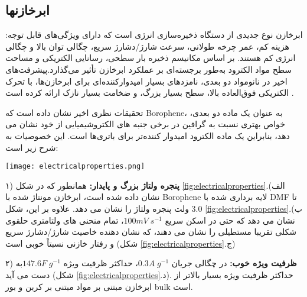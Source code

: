 \subsection{ابرخازنها}
ابرخازن نوع جدیدی از دستگاه ذخیره‌سازی انرژی است که دارای ویژگی‌های قابل توجه: هزینه کم، عمر چرخه طولانی، سرعت شارژ/دشارژ سریع، چگالی توان بالا و چگالی انرژی کم هستند. بر اساس مکانیسم ذخیره بار سطحی، رسانایی الکتریکی و مساحت سطح مواد الکترود به‌طور برجسته‌ای بر عملکرد ابرخازن تأثیر می‌گذارد.پیشرفت‌های اخیر در نانومواد دو بعدی، نامزدهای بسیار امیدوارکننده‌ای برای ابرخازن‌ها، \cite{wangPhaseTransformationGuided2014, lukatskayaCationIntercalationHigh2013, wuTwodimensionalVanadylPhosphate2013, zhangBoropheneExtremelyHigh2016} با تحرک الکتریکی فوق‌العاده بالا، سطح بسیار بزرگ، و ضخامت بسیار نازک ارائه کرده است \cite{zhangBoropheneExtremelyHigh2016, zhanBoronSupercapacitors2016}. 

تحقیقات نظری اخیر نشان داده است که \gls{Borophene}، به عنوان یک ماده دو بعدی، خواص بهتری نسبت به گرافین در برخی جنبه های الکتروشیمیایی از خود نشان می دهد، بنابراین یک ماده الکترود امیدوار کننده‌تر برای باتری‌ها است. این خصوصیات به شرح زیر است: 
\begin{figure*}
    \centering
    \texttt{[image: electricalproperties.png]}
    \caption{خواص الکتروشیمیایی ابرخازن مبتنی بر صفحه آماده شده الف) منحنی های ولتامتری چرخه ای که تحت ولتاژهای مختلف به دست می آیند. ب) منحنی های ولتامتری چرخه ای که تحت نرخ‌های مختلف اسکن جمع آوری شده اند. ج) منحنی‌های GCD تحت چگالی جریان های مختلف آزمایش شده اند. د) ظرفیت سلولی مربوطه (منحنی آبی) و ظرفیت خازنی ویژه (منحنی قرمز) تحت چگالی جریان های مختلف. ه) پایداری تناوبی برای 6000 سیکل (سرعت اسکن: $50 mV s^{-1}$ و)  نایکیست در ابتدا و انتهای 6000 سیکل جمع آوری شد. ز) نمودار راگون در مایع یونی. باتری آماده شده می تواند به عنوان منبع تغذیه برای نور ح) و فن استفاده شود.}
    \label{fig:electricalproperties}
\end{figure*}

۱) \textbf{پنجره ولتاژ بزرگ و پایدار:} همانطور که در شکل \ref{fig:electricalproperties}.الف) نشان داده شده است، ابرخازن مونتاژ شده با \gls{Borophene} لایه برداری شده با \gls{DMF} تا 3.0 ولت پنجره ولتاژ را نشان می دهد. علاوه بر این، شکل \ref{fig:electricalproperties}.ب) نشان می دهد که حتی در اسکن سریع $100 mV\; s^{-1}$، تمام منحنی های ولتامتری حلقوی شکلی تقریبا مستطیلی را نشان می دهند، \cite{luHTiO2MnO2HTiO22013} که نشان دهنده خاصیت شارژ/دشارژ سریع و رفتار خازنی نسبتاً خوبی است (شکل \ref{fig:electricalproperties}.ج) 

۲) \textbf{ظرفیت ویژه خوب:} در چگالی جریان $0.3 A\; g^{-1}$، حداکثر ظرفیت ویژه $147.6 F\; g^{-1}$به دست می آید (شکل \ref{fig:electricalproperties}.د). حداکثر ظرفیت ویژه بسیار بالاتر از ابرخازن مبتنی بر مواد مبتنی بر کربن و بور \gls{bulk} است\cite{liuElectrochemicalBehaviorGraphene2011, chenHighPerformanceSupercapacitors2011}.

